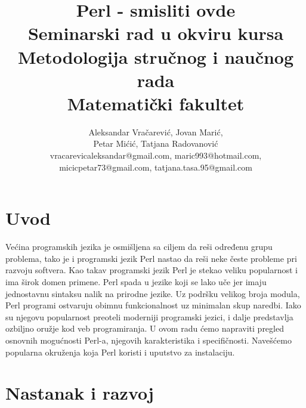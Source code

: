 \documentclass[a4paper]{article}
\begin{document}
\title{Perl - smisliti ovde\\ \small{Seminarski rad u okviru kursa\\Metodologija stručnog i naučnog rada\\ Matematički fakultet}}

\author{Aleksandar Vračarević, Jovan Marić,\\ Petar Mićić, Tatjana Radovanović\\ vracarevicaleksandar@gmail.com, maric993@hotmail.com,\\ micicpetar73@gmail.com, tatjana.tasa.95@gmail.com}


\maketitle

\setcounter{tocdepth}{1}
\tableofcontents

\newpage

\section{Uvod}
\label{sec:uvod}

Ve\'cina programskih jezika je osmi\v sljena sa ciljem da reši određenu grupu problema, tako je i programski jezik Perl nastao da reši neke česte probleme pri razvoju softvera. Kao takav programski jezik Perl je stekao veliku popularnost i ima širok domen primene. Perl spada u jezike koji se lako uče jer imaju jednostavnu sintaksu nalik na prirodne jezike. Uz podršku velikog broja modula, Perl programi ostvaruju obimnu funkcionalnost uz minimalan skup naredbi. Iako su njegovu popularnost
preoteli moderniji programski jezici, i dalje predstavlja ozbiljno oružje kod veb programiranja.
U ovom radu \'cemo napraviti pregled osnovnih mogućnosti Perl-a, njegovih karakteristika i specifičnosti. Navešćemo popularna okruženja koja Perl koristi i uputstvo za instalaciju.




\section{Nastanak i razvoj}
\end{document}

